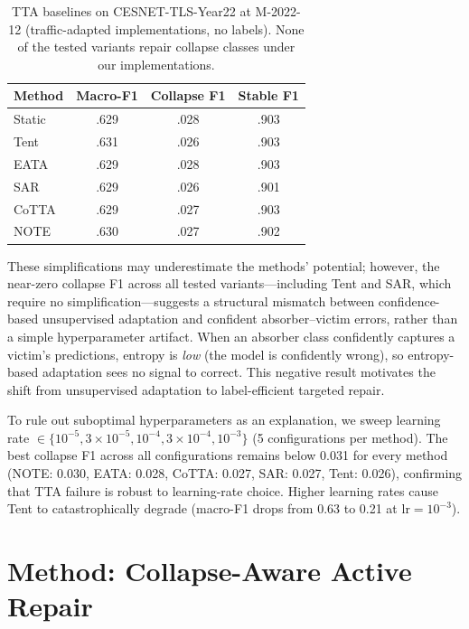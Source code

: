 \documentclass[journal]{IEEEtran}
\begin{document}
\begin{table}[t]
\centering
\caption{TTA baselines on CESNET-TLS-Year22 at M-2022-12 (traffic-adapted implementations, no labels). None of the tested variants repair collapse classes under our implementations.}
\label{tab:tta}
\small
\begin{tabular}{@{}l ccc@{}}
\toprule
Method & Macro-F1 & Collapse F1 & Stable F1 \\
\midrule
Static      & .629 & .028 & .903 \\
Tent        & .631 & .026 & .903 \\
EATA        & .629 & .028 & .903 \\
SAR         & .629 & .026 & .901 \\
CoTTA       & .629 & .027 & .903 \\
NOTE        & .630 & .027 & .902 \\
\bottomrule
\end{tabular}
\end{table}

These simplifications may underestimate the methods' potential; however, the near-zero collapse F1 across all tested variants---including Tent and SAR, which require no simplification---suggests a structural mismatch between confidence-based unsupervised adaptation and confident absorber--victim errors, rather than a simple hyperparameter artifact.
When an absorber class confidently captures a victim's predictions, entropy is \textit{low} (the model is confidently wrong), so entropy-based adaptation sees no signal to correct.
This negative result motivates the shift from unsupervised adaptation to label-efficient targeted repair.

To rule out suboptimal hyperparameters as an explanation, we sweep learning rate $\in\{10^{-5}, 3{\times}10^{-5}, 10^{-4}, 3{\times}10^{-4}, 10^{-3}\}$ (5 configurations per method).
The best collapse F1 across all configurations remains below 0.031 for every method (NOTE: 0.030, EATA: 0.028, CoTTA: 0.027, SAR: 0.027, Tent: 0.026), confirming that TTA failure is robust to learning-rate choice.
Higher learning rates cause Tent to catastrophically degrade (macro-F1 drops from 0.63 to 0.21 at $\text{lr}{=}10^{-3}$).

\section{Method: Collapse-Aware Active Repair}
\label{sec:method}
\end{document}
